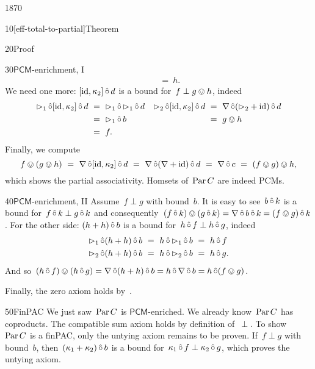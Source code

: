 \begin{parsec}{1870}
\begin{point}{10}[eff-total-to-partial]{Theorem}
\begin{point}{20}{Proof}
\begin{point}{30}{$\mathsf{PCM}$-enrichment, I}
\begin{align*}
    &&& \ = \ h.
\end{align*}
We need one more:
    $[\mathrm{id},\kappa_2]\mathop{\hat\circ} d$ is a bound for~$f \perp g \ovee h$, indeed
\begin{align*}
    \mathord{\vartriangleright}_1 \mathop{\hat\circ} [\mathrm{id},\kappa_2] \mathop{\hat\circ} d
        & \ = \ \mathord{\vartriangleright}_1 \mathop{\hat\circ} \mathord{\vartriangleright}_1 \mathop{\hat\circ} d
    & \mathord{\vartriangleright}_2 \mathop{\hat\circ} [\mathrm{id},\kappa_2]\mathop{\hat\circ} d & \ =\ \nabla \mathop{\hat\circ} (\mathord{\vartriangleright}_2 + \mathrm{id}) \mathop{\hat\circ} d \\
        & \ = \ \mathord{\vartriangleright}_1 \mathop{\hat\circ} b
        && \ =\  g \ovee h \\
        & \ = \ f.
\end{align*}
Finally,
we compute
\begin{equation*}
f \ovee (g \ovee h)
\ = \ \nabla \mathop{\hat\circ} [\mathrm{id}, \kappa_2] \mathop{\hat\circ} d
\ = \ \nabla \mathop{\hat\circ} (\nabla+ \mathrm{id}) \mathop{\hat\circ} d
\ = \ \nabla \mathop{\hat\circ} c
\ = \ (f \ovee g) \ovee h,
\end{equation*}
which shows the partial associativity.
Homsets of~$\operatorname{Par} C$ are indeed PCMs.
\end{point}
\begin{point}{40}{$\mathsf{PCM}$-enrichment, II}%
Assume~$f \perp g$ with bound~$b$.
It is easy to see~$b \mathop{\hat\circ} k$
    is a bound for~$f \mathop{\hat\circ} k \perp g \mathop{\hat\circ} k$
    and consequently~$(f \mathop{\hat\circ} k) \ovee (g \mathop{\hat\circ} k)
                = \nabla \mathop{\hat\circ} b \mathop{\hat\circ} k = 
                (f \ovee g) \mathop{\hat\circ} k$.
For the other side:
$(h + h) \mathop{\hat\circ} b$ is a bound for~$h \mathop{\hat\circ} f \perp h \mathop{\hat\circ} g$,
    indeed
\begin{align*}
    \pproj_1 \hafter (h+h) \hafter b
    &\ = \ 
    h\hafter \pproj_1 \hafter b \ =\  h \hafter f \\
    \pproj_2 \hafter (h+h) \hafter b
    &\ = \ 
    h\hafter \pproj_2 \hafter b\  =\  h \hafter g.
\end{align*}
And so~$(h \mathop{\hat\circ} f) \ovee (h \mathop{\hat\circ} g)
            = \nabla \mathop{\hat\circ} (h+h) \mathop{\hat\circ} b
            = h \mathop{\hat\circ} \nabla \mathop{\hat\circ} b = h \mathop{\hat\circ} (f \ovee g)$.
\end{point}
Finally, the zero axiom holds by~\sref{toteff-zero}.
\begin{point}{50}{FinPAC}%
We just saw~$\operatorname{Par} C$ is $\mathsf{PCM}$-enriched.
We already know~$\operatorname{Par} C$ has coproducts.
The compatible sum axiom holds by definition of~$\perp$.
To show~$\operatorname{Par} C$ is a finPAC,
    only the untying axiom remains to be proven.
If~$f \perp g$ with bound~$b$,
then~$(\kappa_1 + \kappa_2) \mathop{\hat\circ} b$ is a bound for~$\kappa_1 \mathop{\hat\circ} f
    \perp \kappa_2 \mathop{\hat\circ} g$,
    which proves the untying axiom.
\end{point}

\end{point}
\end{point}
\end{parsec}
